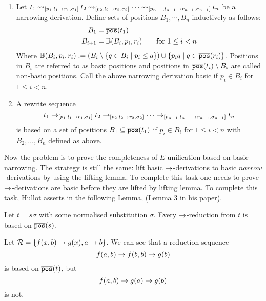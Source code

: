\begin{definition}
	\begin{enumerate}
		\item Let $t_1 \mathbin{\rightsquigarrow}_{[p_1, l_1 \rightarrow r_1, \sigma_1]} t_2 \mathbin{\rightsquigarrow}_{[p_2, l_2 \rightarrow r_2, \sigma_2]} \cdots \mathbin{\rightsquigarrow}_{[p_{n-1}, l_{n-1} \rightarrow r_{n-1}, \sigma_{n-1}]} t_n$ be a narrowing derivation. Define sets of positions $B_1, \cdots, B_n$ inductively as follows:
		      \begin{align*}
			      B_1     & = \overline{\mathtt{pos}}(t_1)                                            \\
			      B_{i+1} & = \mathbb{B}(B_i, p_i, r_i) \qquad \text{for } 1 \leq i < n
		      \end{align*}
		      Where $\mathbb{B}(B_i, p_i, r_i) := (B_i \setminus \{ q \in B_i \mid p_i \leq q \}) \cup \{ p_iq \mid q \in \overline{\mathtt{pos}}(r_i) \}$. Positions in $B_i$ are referred to as basic positions and positions in $\overline{\mathtt{pos}}(t_i) \setminus B_i$ are called non-basic positions. Call the above narrowing derivation basic if $p_i \in B_i$ for $1 \leq i < n$.
		\item A rewrite sequence
		      $$t_1 \rightarrow_{[p_1, l_1 \rightarrow r_1, \sigma_1]} t_2 \rightarrow_{[p_2, l_2 \rightarrow r_2, \sigma_2]} \cdots \rightarrow_{[p_{n-1}, l_{n-1} \rightarrow r_{n-1}, \sigma_{n-1}]} t_n$$
		      is based on a set of positions $B_1 \subseteq \overline{\mathtt{pos}}(t_1)$ if $p_i \in B_i$ for $1 \leq i < n$ with $B_2, \dots, B_n$ defined as above.
	\end{enumerate}
\end{definition}

Now the problem is to prove the completeness of $E$-unification based on basic narrowing. The strategy is still the same: lift basic $\rightarrow$-derivations to basic $narrow$-derivations by using the lifting lemma. To complete this task one needs to prove $\rightarrow$-derivations are basic before they are lifted by lifting lemma. To complete this task, Hullot asserts in \cite{hullot:cfunif} the following Lemma, (Lemma 3 in his paper).

\begin{lemma}
	Let $t = s\sigma$ with some normalised substitution $\sigma$. Every $\rightarrow$-reduction from $t$ is based on $\overline{\mathtt{pos}}(s)$.
\end{lemma}

\begin{example}\label{example:hullot-counter-ex}
	Let $\mathcal{R} = \{ f(x,b) \rightarrow g(x), a \rightarrow b \}$. We can see that a reduction sequence
	$$f(a,b) \rightarrow f(b,b) \rightarrow g(b)$$
	is based on $\overline{\mathtt{pos}}(t)$, but
	$$f(a,b) \rightarrow g(a) \rightarrow g(b)$$
	is not.
\end{example}

